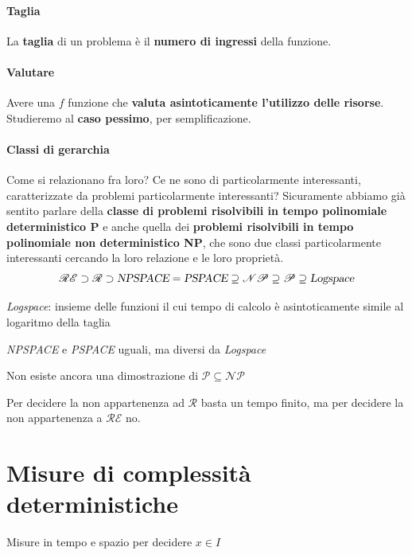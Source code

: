 \documentclass[10pt]{book}
\begin{document}
\paragraph{Taglia} La \textbf{taglia} di un problema è il \textbf{numero di ingressi} della funzione.
\paragraph{Valutare} Avere una $f$ funzione che \textbf{valuta asintoticamente l'utilizzo delle risorse}. Studieremo al \textbf{caso pessimo}, per semplificazione.
\paragraph{Classi di gerarchia} Come si relazionano fra loro? Ce ne sono di particolarmente interessanti, caratterizzate da problemi particolarmente interessanti? Sicuramente abbiamo già sentito parlare della \textbf{classe di problemi risolvibili in tempo polinomiale deterministico P} e anche quella dei  \textbf{problemi risolvibili in tempo polinomiale non deterministico NP}, che sono due classi particolarmente interessanti cercando la loro relazione e le loro proprietà.
$$\mathscr{RE} \supset \mathscr{R} \supset \textsl{NPSPACE} = \textsl{PSPACE} \supseteq \mathscr{NP} \supseteq \mathscr{P} \supseteq \textsl{Logspace}$$
\begin{list}{}{Considerando}
	\item \textsl{Logspace}: insieme delle funzioni il cui tempo di calcolo è asintoticamente simile al logaritmo della taglia
	\item \textsl{NPSPACE} e \textsl{PSPACE} uguali, ma diversi da \textsl{Logspace}
	\item Non esiste ancora una dimostrazione di $\mathscr{P} \subseteq \mathscr{NP}$
	\item Per decidere la non appartenenza ad $\mathscr{R}$ basta un tempo finito, ma per decidere la non appartenenza a $\mathscr{RE}$ no.
\end{list}
\section{Misure di complessità deterministiche}
Misure in tempo e spazio per decidere $x \in I$
\end{document}
